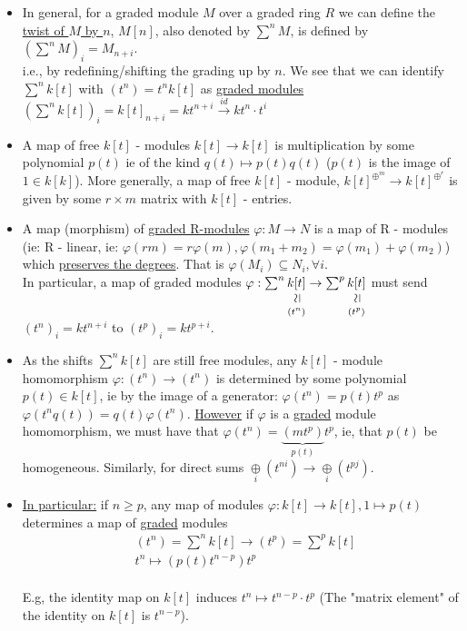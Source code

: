 \documentclass[11pt,a4paper]{report}
\newcommand{\vertsimeq}{\rotatebox{90}{$\,\simeq$}}
\newcommand{\simequalto}[2]{\underset{\scriptstyle\overset{\mkern4mu\vertsimeq}{#2}}{#1}}
\begin{document}
\begin{itemize}
              \item 
              In general, for a graded module $M$ over a graded ring $R$ we can define the \underline{twist of $M$ by $n$}, $M[n]$, also denoted by $\sum^nM$, is defined by $(\sum^nM)_i = M_{n+i}$.\\
              i.e., by redefining/shifting the grading up by $n$. We see that we can identify $\sum^nk[t]$ with $(t^n) = t^nk[t]$ as \underline{graded modules} $(\sum^nk[t])_i = k[t]_{n+i} = kt^{n+i} \xrightarrow{id} kt^n\cdot t^i$\\
              \item
              A map of free $k[t]$ - modules $k[t] \rightarrow k[t]$ is multiplication by some polynomial $p(t)$ ie of the kind $q(t) \mapsto p(t)q(t)$ ($p(t)$ is the image of $1 \in k[k]$). More generally, a map of free $k[t]$ - module, $k[t]^{\oplus^{m}} \rightarrow k[t]^{\oplus^{r}}$ is given by some $r \times m$ matrix with $k[t]$ - entries.\\
              \item
              A map (morphism) of \underline{graded R-modules} $\varphi: M \rightarrow N$ is a map of R - modules (ie: R - linear, ie: $\varphi(rm) = r \varphi(m), \varphi(m_1 + m_2) = \varphi(m_1) + \varphi(m_2)$) which \underline{preserves the degrees}. That is $\varphi(M_i) \subseteq N_i, \forall i$.\\
              In particular, a map of graded modules $\varphi: \sum^n\simequalto{k[t]}{(t^n)} \rightarrow \sum^p\simequalto{k[t]}{(t^p)}$ must send $(t^n)_i = kt^{n+i}$ to $(t^p)_i = kt^{p+i}$.\\
              \item
              As the shifts $\sum^nk[t]$ are still free modules, any $k[t]$ - module homomorphism $\varphi: (t^n) \rightarrow (t^n)$ is determined by some polynomial $p(t) \in k[t]$, ie by the image of a generator: $\varphi(t^n) = p(t)t^p$ as $\varphi(t^nq(t)) = q(t)\varphi(t^n)$. \underline{However} if $\varphi$ is a \underline{graded} module homomorphism, we must have that $\varphi(t^n) = \underbrace{(mt^p)}_{p(t)}t^p$, ie, that $p(t)$ be homogeneous. Similarly, for direct sums $\underset{i}{\oplus}(t^{ni}) \rightarrow \underset{i}{\oplus}(t^{pj})$.\\
              \item
              \underline{In particular:} if $n \ge p$, any map of modules $\varphi: k[t] \rightarrow k[t], 1 \mapsto p(t)$ determines a map of \underline{graded} modules
              \begin{align*}
                &(t^n) = \sum^nk[t] \rightarrow (t^p) = \sum^pk[t]\\
                &t^n \mapsto (p(t)t^{n-p})t^p
              \end{align*}
              \\
              E.g, the identity map on $k[t]$ induces $t^n \mapsto t^{n-p} \cdot t^p$ (The "matrix element" of the identity on $k[t]$ is $t^{n-p}$).
              \end{itemize}
\end{document}
